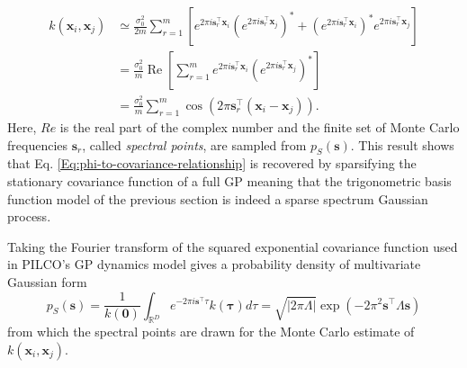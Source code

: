 \begin{equation}
    \begin{aligned} 
    k\left(\mathbf{x}_{i}, \mathbf{x}_{j}\right) 
    & \simeq \frac{\sigma_{0}^{2}}{2 m} \sum_{r=1}^{m}\left[e^{2 \pi i \mathbf{s}_{r}^{\top} \mathbf{x}_{i}}\left(e^{2 \pi i \mathbf{s}_{r}^{\top} \mathbf{x}_{j}}\right)^{*}+\left(e^{2 \pi i \mathbf{s}_{r}^{\top} \mathbf{x}_{i}}\right)^{*} e^{2 \pi i \mathbf{s}_{r}^{\top} \mathbf{x}_{j}}\right] \\ &=\frac{\sigma_{0}^{2}}{m} \operatorname{Re}\left[\sum_{r=1}^{m} e^{2 \pi i \mathbf{s}_{r}^{\top} \mathbf{x}_{i}}\left(e^{2 \pi i \mathbf{s}_{r}^{\top} \mathbf{x}_{j}}\right)^{*}\right] \\
    &=\frac{\sigma_{0}^{2}}{m} \sum_{r=1}^{m} \cos \left(2 \pi \mathbf{s}_{r}^{\top}\left(\mathbf{x}_{i}-\mathbf{x}_{j}\right)\right).
    \end{aligned}
\end{equation}
Here, $Re$ is the real part of the complex number and the finite set of Monte Carlo frequencies $\mathbf{s}_{r}$, called \textit{spectral points}, are sampled from $p_{S}(\mathbf{s})$. This result shows that Eq. \ref{Eq:phi-to-covariance-relationship} is recovered by sparsifying the stationary covariance function of a full GP meaning that the trigonometric basis function model of the previous section is indeed a sparse spectrum Gaussian process. 

Taking the Fourier transform of the squared exponential covariance function used in PILCO's GP dynamics model gives a probability density of multivariate Gaussian form
\begin{equation}
    p_{S}(\mathbf{s})=\frac{1}{k(\mathbf{0})} \int_{\mathbb{R}^{D}} e^{-2 \pi i \mathbf{s}^{\top} \tau} k(\mathbf{\tau}) d \tau=\sqrt{|2 \pi \Lambda|} \exp \left(-2 \pi^{2} \mathbf{s}^{\top} \Lambda \mathbf{s}\right)
    \label{Eq:Gaussian-spectral-points-sample}
\end{equation}
from which the spectral points are drawn for the Monte Carlo estimate of $k(\mathbf{x}_{i},\mathbf{x}_{j})$. 

